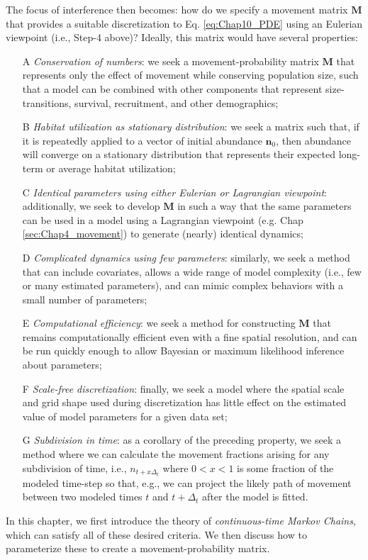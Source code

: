 The focus of interference then becomes: how do we specify a movement matrix \(\mathbf{M}\) that provides a suitable discretization to Eq. \ref{eq:Chap10_PDE} using an Eulerian viewpoint (i.e., Step-4 above)?  Ideally, this matrix would have several properties:
\begin{enumerate}
    \item[A] \textit{Conservation of numbers}:  we seek a movement-probability matrix \(\mathbf{M}\) that represents only the effect of movement while conserving population size, such that a model can be combined with other components that represent size-transitions, survival, recruitment, and other demographics;

    \item[B] \textit{Habitat utilization as stationary distribution}:  we seek a matrix such that, if it is repeatedly applied to a vector of initial abundance \(\mathbf{n}_0\), then abundance will converge on a stationary distribution that represents their expected long-term or average habitat utilization;
    
    \item[C] \textit{Identical parameters using either Eulerian or Lagrangian viewpoint}:  additionally, we seek to develop \(\mathbf{M}\) in such a way that the same parameters can be used in a model using a Lagrangian viewpoint (e.g. Chap \ref{sec:Chap4_movement}) to generate (nearly) identical dynamics;  

    \item[D] \textit{Complicated dynamics using few parameters}:  similarly, we seek a method that can include covariates, allows a wide range of model complexity (i.e., few or many estimated parameters), and can mimic complex behaviors with a small number of parameters;
    
    \item[E] \textit{Computational efficiency}:  we seek a method for constructing \(\mathbf{M}\) that remains computationally efficient even with a fine spatial resolution, and can be run quickly enough to allow Bayesian or maximum likelihood inference about parameters;
    
    \item[F] \textit{Scale-free discretization}:  finally, we seek a model where the spatial scale and grid shape used during discretization has little effect on the estimated value of model parameters for a given data set; 

    \item[G] \textit{Subdivision in time}:  as a corollary of the preceding property, we seek a method where we can calculate the movement fractions arising for any subdivision of time, i.e., \(n_{t + x \Delta_t}\) where \(0 < x< 1\) is some fraction of the modeled time-step so that, e.g., we can project the likely path of movement between two modeled times \(t\) and \(t+\Delta_t\) after the model is fitted.  
    
\end{enumerate}
In this chapter, we first introduce the theory of \textit{continuous-time Markov Chains}, which can satisfy all of these desired criteria. We then discuss how to parameterize these to create a movement-probability matrix.  

